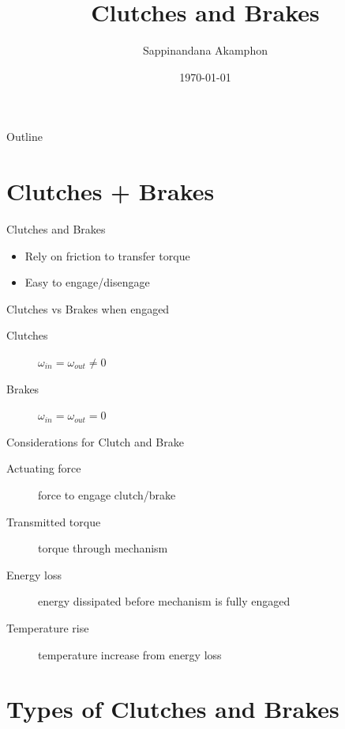 \documentclass[10pt, svgnames]{beamer}
\author{Sappinandana Akamphon}
\date{\today}
\title{Clutches and Brakes}
\institute{Department of Mechanical Engineering, TSE}
\date{}
\begin{document}
\maketitle
\begin{frame}{Outline}
\tableofcontents
\end{frame}


\section{Clutches + Brakes}
\label{sec:org75f4af4}

\begin{frame}[label={sec:org9fe8313}]{Clutches and Brakes}
\begin{itemize}
\item Rely on friction to transfer torque
\item Easy to engage/disengage
\end{itemize}
\end{frame}

\begin{frame}[label={sec:org568d27d}]{Clutches vs Brakes}
when engaged

\begin{description}
\item[{Clutches}] \(\omega_{in} = \omega_{out} \neq 0\)
\item[{Brakes}] \(\omega_{in} = \omega_{out} = 0\)
\end{description}
\end{frame}

\begin{frame}[label={sec:orgdd21d84}]{Considerations for Clutch and Brake}
\begin{description}
\item[{Actuating force}] force to engage clutch/brake
\item[{Transmitted torque}] torque through mechanism
\item[{Energy loss}] energy dissipated before mechanism is fully engaged
\item[{Temperature rise}] temperature increase from energy loss
\end{description}
\end{frame}

\section{Types of Clutches and Brakes}
\label{sec:org520d7e1}
\end{document}
